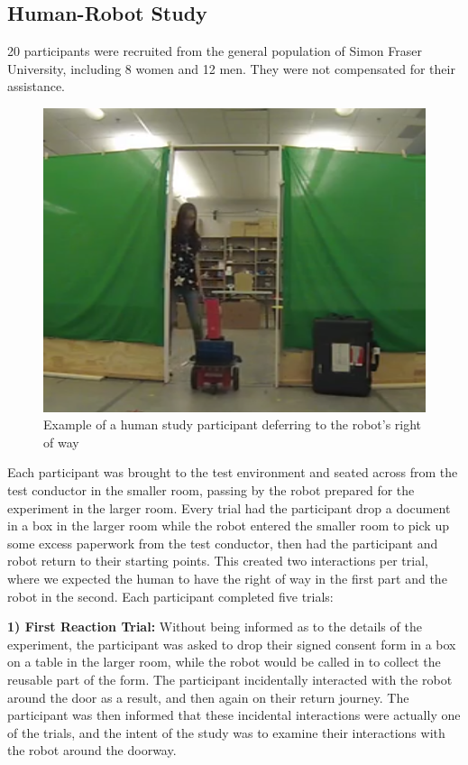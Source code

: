 \documentclass[letterpaper, 10 pt, conference]{ieeeconf}  %
\begin{document}
\subsection{Human-Robot Study}

20 participants were recruited from the general population of Simon Fraser University, including 8 women and 12 men. They were not compensated for their assistance.

     \begin{figure}
      \centering
      \includegraphics[scale=0.5]{test_example.png}
      \caption{Example of a human study participant deferring to the robot's right of way}
      \label{fig:Example}
   \end{figure}

Each participant was brought to the test environment and seated across from the test conductor in the smaller room, passing by the robot prepared for the experiment in the larger room. Every trial had the participant drop a document in a box in the larger room while the robot entered the smaller room to pick up some excess paperwork from the test conductor, then had the participant and robot return to their starting points. This created two interactions per trial, where we expected the human to have the right of way in the first part and the robot in the second. Each participant completed five trials:

\textbf{1) First Reaction Trial:} Without being informed as to the details of the experiment, the participant was asked to drop their signed consent form in a box on a table in the larger room, while the robot would be called in to collect the reusable part of the form. The participant incidentally interacted with the robot around the door as a result, and then again on their return journey. The participant was then informed that these incidental interactions were actually one of the trials, and the intent of the study was to examine their interactions with the robot around the doorway.
\end{document}
